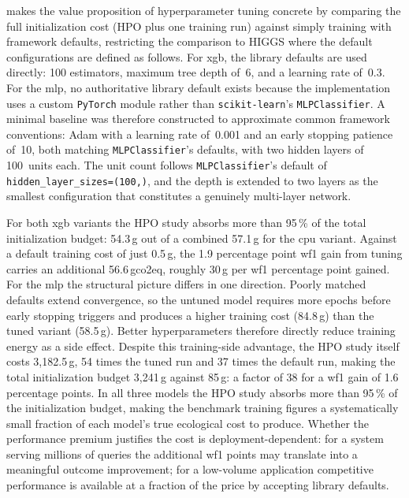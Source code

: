  makes the value proposition of hyperparameter tuning concrete by comparing the full initialization cost (HPO plus one training run) against simply training with framework defaults, restricting the comparison to HIGGS where the default configurations are defined as follows. For \gls{xgb}, the
library defaults are used directly: 100 estimators, maximum tree depth
of~6, and a learning rate of~0.3. For the \gls{mlp}, no authoritative
library default exists because the implementation uses a custom
\texttt{PyTorch} module rather than \texttt{scikit-learn}'s
\texttt{MLPClassifier}. A minimal baseline was therefore constructed to
approximate common framework conventions: Adam with a learning rate
of~0.001 and an early stopping patience of~10, both matching
\texttt{MLPClassifier}'s defaults, with two hidden layers of 100~units
each. The unit count follows \texttt{MLPClassifier}'s default of
\texttt{hidden\_layer\_sizes=(100,)}, and the depth is extended to two
layers as the smallest configuration that constitutes a genuinely
multi-layer network.

For both \gls{xgb} variants the HPO study absorbs more than 95\,\% of the total initialization budget: 54.3\,g out of a combined 57.1\,g for the \gls{cpu} variant. Against a default training cost of just 0.5\,g, the 1.9 percentage point \gls{wf1} gain from tuning carries an additional 56.6\,\gls{gco2eq}, roughly 30\,g per \gls{wf1} percentage point gained. For the \gls{mlp} the structural picture differs in one direction. Poorly matched defaults extend convergence, so the untuned model requires more epochs before early stopping triggers and produces a higher training cost (84.8\,g) than the tuned variant (58.5\,g). Better hyperparameters therefore directly reduce training energy as a side effect. Despite this training-side advantage, the HPO study itself costs 3{,}182.5\,g, 54 times the tuned run and 37 times the default run, making the total initialization budget 3{,}241\,g against 85\,g: a factor of 38 for a \gls{wf1} gain of 1.6 percentage points. In all three models the HPO study absorbs more than 95\,\% of the initialization budget, making the benchmark training figures a systematically small fraction of each model's true ecological cost to produce. Whether the performance premium justifies the cost is deployment-dependent: for a system serving millions of queries the additional \gls{wf1} points may translate into a meaningful outcome improvement; for a low-volume application competitive performance is available at a fraction of the price by accepting library defaults.


